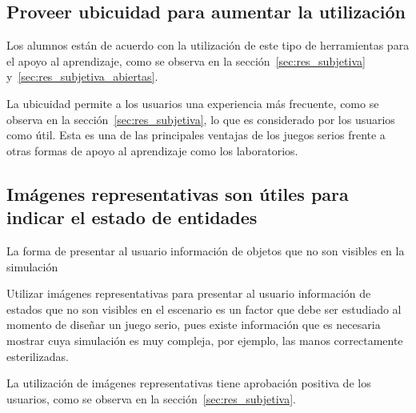 \subsection{Proveer ubicuidad para aumentar la utilización}


Los alumnos están de acuerdo con la utilización de este tipo de herramientas
para el apoyo al aprendizaje, como se observa en la
sección~\ref{sec:res_subjetiva} y~\ref{sec:res_subjetiva_abiertas}.

La ubicuidad permite a los usuarios una experiencia más frecuente, como se
observa en la sección~\ref{sec:res_subjetiva}, lo que es considerado por los
usuarios como útil. Esta es una de las principales ventajas de los juegos serios
frente a otras formas de apoyo al aprendizaje como los laboratorios.

\subsection{Imágenes representativas son útiles para indicar el estado de
    entidades}

La forma de presentar al usuario información de objetos que no son visibles
en la simulación 

Utilizar imágenes representativas para presentar al usuario información de
estados que no son visibles en el escenario es un factor que debe ser estudiado
al momento de diseñar un juego serio, pues existe información que es necesaria
mostrar cuya simulación es muy compleja, por ejemplo, las manos correctamente
esterilizadas.

La utilización de imágenes representativas tiene aprobación positiva de los
usuarios, como se observa en la sección~\ref{sec:res_subjetiva}.
